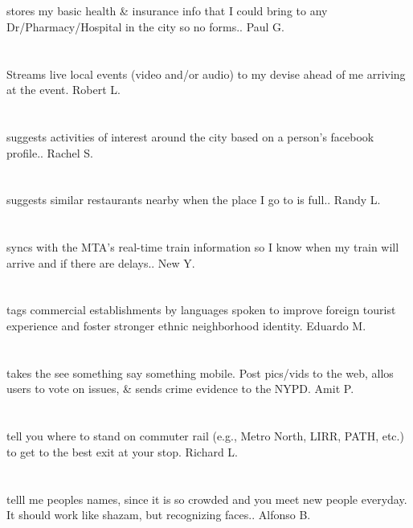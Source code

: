 \section{} stores my basic health \& insurance info that I could bring to any Dr/Pharmacy/Hospital in the city so no forms.. Paul G.
\section{}Streams live local events (video and/or audio) to my devise ahead of me arriving at the event. Robert L.
\section{}suggests activities of interest around the city based on a person's facebook profile.. Rachel S.
\section{}suggests similar restaurants nearby when the place I go to is full.. Randy L.
\section{}syncs with the MTA's real-time train information so I know when my train will arrive and if there are delays.. New Y.
\section{}tags commercial establishments by languages spoken to improve foreign tourist experience and foster stronger ethnic neighborhood identity. Eduardo M.
\section{}takes the see something say something mobile. Post pics/vids to the web,  allos users to vote on issues,  \& sends crime evidence to the NYPD. Amit P.
\section{} tell you where to stand on commuter rail (e.g.,  Metro North,  LIRR,  PATH,  etc.) to get to the best exit at your stop. Richard L.
\section{}telll me peoples names,  since  it is so crowded and you meet new people everyday. It should work like  shazam,  but recognizing faces.. Alfonso B.
